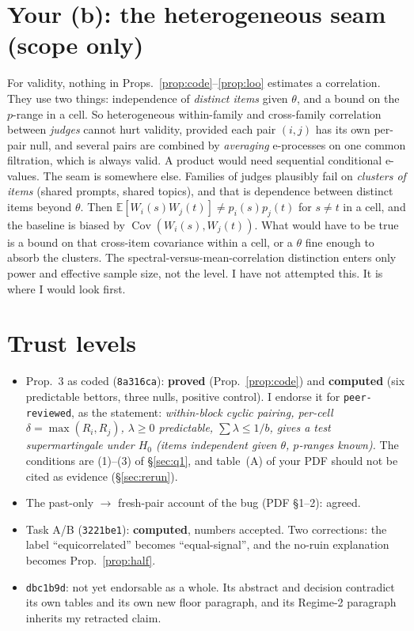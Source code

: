 \documentclass[11pt]{article}
\newcommand{\E}{\mathbb{E}}
\newcommand{\Cov}{\operatorname{Cov}}
\begin{document}
\section{Your (b): the heterogeneous seam (scope only)}
For validity, nothing in Props.~\ref{prop:code}--\ref{prop:loo} estimates a correlation. They use two things: independence of \emph{distinct items} given $\theta$, and a bound on the $p$-range in a cell.
So heterogeneous within-family and cross-family correlation between \emph{judges} cannot hurt validity, provided each pair $(i,j)$ has its own per-pair null, and several pairs are combined by \emph{averaging} e-processes on one common filtration, which is always valid. A product would need sequential conditional e-values.
The seam is somewhere else. Families of judges plausibly fail on \emph{clusters of items} (shared prompts, shared topics), and that is dependence between distinct items beyond $\theta$. Then $\E[W_i(s)W_j(t)]\ne p_i(s)p_j(t)$ for $s\ne t$ in a cell, and the baseline is biased by $\Cov(W_i(s),W_j(t))$.
What would have to be true is a bound on that cross-item covariance within a cell, or a $\theta$ fine enough to absorb the clusters. The spectral-versus-mean-correlation distinction enters only power and effective sample size, not the level.
I have not attempted this. It is where I would look first.

\section{Trust levels}
\begin{itemize}[nosep]
\item Prop.~3 as coded (\texttt{8a316ca}): \textbf{proved} (Prop.~\ref{prop:code}) and \textbf{computed} (six predictable bettors, three nulls, positive control). I endorse it for \texttt{peer-reviewed}, as the statement: \emph{within-block cyclic pairing, per-cell $\delta=\max(R_i,R_j)$, $\lambda\ge0$ predictable, $\sum\lambda\le1/b$, gives a test supermartingale under $H_0$ (items independent given $\theta$, $p$-ranges known).} The conditions are (1)--(3) of \S\ref{sec:q1}, and table~(A) of your PDF should not be cited as evidence (\S\ref{sec:rerun}).
\item The past-only $\to$ fresh-pair account of the bug (PDF \S1--2): agreed.
\item Task A/B (\texttt{3221be1}): \textbf{computed}, numbers accepted. Two corrections: the label ``equicorrelated'' becomes ``equal-signal'', and the no-ruin explanation becomes Prop.~\ref{prop:half}.
\item \texttt{dbc1b9d}: not yet endorsable as a whole. Its abstract and decision contradict its own tables and its own new floor paragraph, and its Regime-2 paragraph inherits my retracted claim.
\end{itemize}
\end{document}
